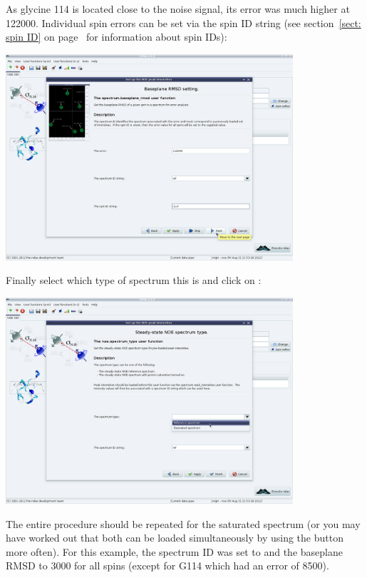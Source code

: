 As glycine 114 is located close to the noise signal, its error was much higher at 122000.  Individual spin errors can be set via the spin ID string (see section~\ref{sect: spin ID} on page~\pageref{sect: spin ID} for information about spin IDs):

\begin{minipage}[h]{\linewidth}
\centerline{\includegraphics[width=0.8\textwidth, bb=14 14 1415 1019]{graphics/screenshots/noe_analysis/peak_intensity6}}
\end{minipage}

Finally select which type of spectrum this is and click on :

\begin{minipage}[h]{\linewidth}
\centerline{\includegraphics[width=0.8\textwidth, bb=14 14 1415 1019]{graphics/screenshots/noe_analysis/peak_intensity7}}
\end{minipage}

The entire procedure should be repeated for the saturated spectrum (or you may have worked out that both can be loaded simultaneously by using the  button more often).  For this example, the spectrum ID was set to  and the baseplane RMSD to 3000 for all spins (except for G114 which had an error of 8500).

